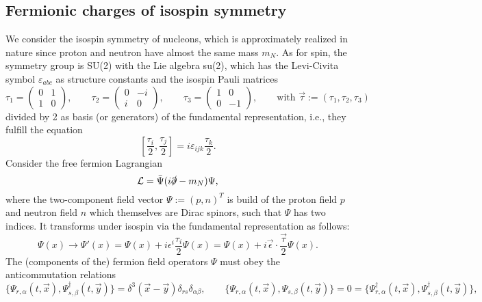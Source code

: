 \documentclass[11pt]{latex/exercise}
\begin{document}
\subsection{Fermionic charges of isospin symmetry}
\noindent
We consider the isospin symmetry of nucleons, which is approximately realized in nature since proton and neutron have almost the same mass $m_N$.
As for spin, the symmetry group is SU(2) with the Lie algebra su(2), which has the Levi-Civita symbol $\varepsilon_{abc}$ as structure constants and the isospin Pauli matrices
\begin{equation}
    \tau_1 = \begin{pmatrix} 0&1\\ 1&0 \end{pmatrix}, \qquad
    \tau_2 = \begin{pmatrix} 0&-i\\ i&0 \end{pmatrix}, \qquad
    \tau_3 = \begin{pmatrix} 1&0\\ 0&-1 \end{pmatrix}, \qquad
    \text{with } \vec{\tau} := (\tau_1, \tau_2, \tau_3)
\end{equation}
divided by 2 as basis (or generators) of the fundamental representation, i.e., they fulfill the equation
\begin{equation}
    \left[ \frac{\tau_i}{2}, \frac{\tau_j}{2} \right] = i \varepsilon_{ijk} \frac{\tau_k}{2} .
\end{equation}
Consider the free fermion Lagrangian
\begin{equation}
    \mathcal{L} = \bar\Psi ( i \slashed{\partial} - m_N ) \Psi ,
\end{equation}
where the two-component field vector $\Psi := (p,n)^T$ is build of the proton field $p$ and neutron field $n$ which themselves are Dirac spinors, such that $\Psi$ has two indices. It transforms under isospin via the fundamental representation as follows:
\begin{equation}
    \label{eq:transformation_isospin}
    \Psi(x) \rightarrow \Psi'(x) = \Psi(x) + i \epsilon^i \frac{\tau_i}{2} \Psi(x) = \Psi(x) + i \vec\epsilon \cdot \frac{\vec\tau}{2} \Psi(x) .
\end{equation}
The (components of the) fermion field operators $\Psi$ must obey the anticommutation relations
\begin{equation}
    \label{eq:equ-time_commutation_fermions}
    \{\Psi_{r,\alpha}(t,\vec x), \Psi_{s,\beta}^\dagger(t,\vec y)\} = \delta^3(\vec x - \vec y) \delta_{rs} \delta_{\alpha\beta} , \qquad
    \{\Psi_{r,\alpha}(t,\vec x), \Psi_{s,\beta}(t,\vec y)\} = 0 = \{\Psi_{r,\alpha}^\dagger(t,\vec x), \Psi_{s,\beta}^\dagger(t,\vec y)\} ,
\end{equation}
\end{document}
